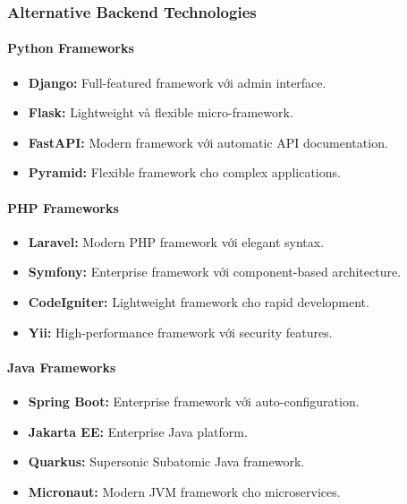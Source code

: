 \documentclass[a4paper,12pt]{report}
\begin{document}
\subsubsection{Alternative Backend Technologies}

\paragraph{Python Frameworks}
\begin{itemize}
    \item \textbf{Django:} Full-featured framework với admin interface.
    \item \textbf{Flask:} Lightweight và flexible micro-framework.
    \item \textbf{FastAPI:} Modern framework với automatic API documentation.
    \item \textbf{Pyramid:} Flexible framework cho complex applications.
\end{itemize}

\paragraph{PHP Frameworks}
\begin{itemize}
    \item \textbf{Laravel:} Modern PHP framework với elegant syntax.
    \item \textbf{Symfony:} Enterprise framework với component-based architecture.
    \item \textbf{CodeIgniter:} Lightweight framework cho rapid development.
    \item \textbf{Yii:} High-performance framework với security features.
\end{itemize}

\paragraph{Java Frameworks}
\begin{itemize}
    \item \textbf{Spring Boot:} Enterprise framework với auto-configuration.
    \item \textbf{Jakarta EE:} Enterprise Java platform.
    \item \textbf{Quarkus:} Supersonic Subatomic Java framework.
    \item \textbf{Micronaut:} Modern JVM framework cho microservices.
\end{itemize}
\end{document}
